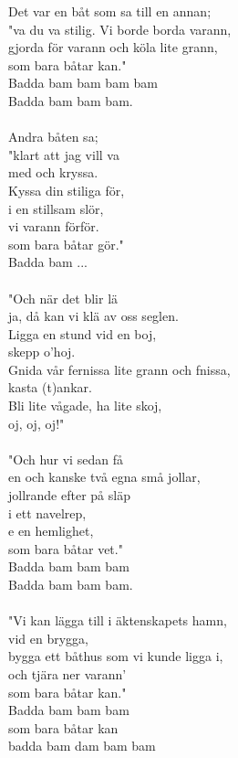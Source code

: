 \vspace{10pt}
Det var en båt som sa till en annan;\\
"va du va stilig. Vi borde borda varann,\\
gjorda för varann och köla lite grann,\\
som bara båtar kan."\\
Badda bam bam bam bam\\
Badda bam bam bam.\\
\\
Andra båten sa;\\
"klart att jag vill va\\
med och kryssa.\\
Kyssa din stiliga för,\\
i en stillsam slör,\\
vi varann förför.\\
som bara båtar gör."\\
Badda bam ...\\
\\
"Och när det blir lä\\
ja, då kan vi klä av oss seglen.\\
Ligga en stund vid en boj,\\
skepp o'hoj.\\
Gnida vår fernissa lite grann och fnissa,\\
kasta (t)ankar.\\
Bli lite vågade, ha lite skoj,\\
oj, oj, oj!"\\
\\
"Och hur vi sedan få\\
en och kanske två egna små jollar,\\
jollrande efter på släp\\
i ett navelrep,\\
e en hemlighet,\\
som bara båtar vet."\\
Badda bam bam bam\\
Badda bam bam bam.\\
\\
"Vi kan lägga till i äktenskapets hamn,\\
vid en brygga,\\
bygga ett båthus som vi kunde ligga i,\\
och tjära ner varann'\\
som bara båtar kan."\\
Badda bam bam bam\\
som bara båtar kan\\
badda bam dam bam bam
